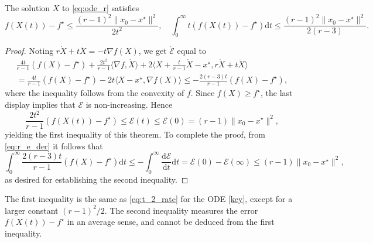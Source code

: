 \documentclass[twoside,11pt]{article}
\renewcommand{\d}{{\mathrm{d}}}
\begin{document}
\begin{theorem}\label{thm:large_r}
The solution $X$ to \eqref{eq:ode_r} satisfies
\begin{equation}\nonumber
f(X(t)) - f^\star \le \frac{(r-1)^2\|x_0 - x^\star\|^2}{2t^2}, \quad \int^{\infty}_0 t(f(X(t))-f^\star)\d t \le \frac{(r-1)^2\|x_0 - x^\star\|^2}{2(r-3)}.
\end{equation}
\end{theorem}

\begin{proof}
Noting $r\dot{X} + t\ddot{X} = -t\nabla f(X)$, we get $\dot{\mathcal{E}}$ equal to
\begin{multline}\label{eq:r_e_der}
\frac{4t}{r-1}(f(X) - f^\star) + \frac{2t^2}{r-1}\langle \nabla f, \dot{X} \rangle 
+ 2\langle X + \frac{t}{r-1}\dot{X} - x^\star, r\dot{X} + t\ddot{X} \rangle\\
= \frac{4t}{r-1}(f(X) - f^\star) - 2t\langle X - x^\star, \nabla f(X) \rangle 
\le -\frac{2(r-3)t}{r-1}(f(X) - f^\star),
\end{multline}
where the inequality follows from the convexity of $f$. Since $f(X)\geq f^\star$, the last display implies that $\mathcal{E}$ is non-increasing. Hence
\begin{equation}\nonumber
\frac{2t^2}{r-1}(f(X(t)) - f^\star) \le \mathcal{E}(t) \le \mathcal{E}(0) = (r-1)\|x_0 - x^\star\|^2,
\end{equation}
yielding the first inequality of this theorem. To complete the proof, from \eqref{eq:r_e_der} it follows that
\begin{equation}\nonumber
\int^{\infty}_0\frac{2(r-3)t}{r-1}(f(X) - f^\star)\d t \le -\int^{\infty}_0 \frac{\d\mathcal{E}}{\d t}\d t = \mathcal{E}(0) - \mathcal{E}(\infty) \le  (r-1)\|x_0 - x^\star\|^2,
\end{equation}
as desired for establishing the second inequality.
\end{proof}
The first inequality is the same as \eqref{eq:t_2_rate} for the ODE \eqref{key}, except for a larger constant $(r-1)^2/2$. The second inequality measures the error $f(X(t)) - f^\star$ in an average sense, and cannot be deduced from the first inequality.
\end{document}
